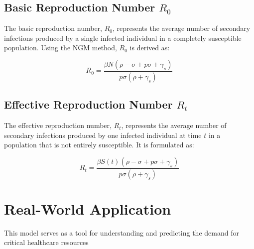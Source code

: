 \documentclass[lettersize, journal]{IEEEtran}
\begin{document}
\subsection{Basic Reproduction Number \( R_0 \)}
The basic reproduction number, \( R_0 \), represents the average number of secondary infections produced by a single infected individual in a completely susceptible population. Using the NGM method, \( R_0 \) is derived as:

\[ R_0 = \frac{\beta N ( \rho - \sigma + p \sigma + \gamma_s )}{p \sigma ( \rho + \gamma_s )} \]

\subsection{Effective Reproduction Number \( R_t \)}
The effective reproduction number, \( R_t \), represents the average number of secondary infections produced by one infected individual at time \( t \) in a population that is not entirely susceptible. It is formulated as:

\[ R_t = \frac{\beta S(t) ( \rho - \sigma + p \sigma + \gamma_s )}{p \sigma ( \rho + \gamma_s )} \]

\section{Real-World Application}
This model serves as a tool for understanding and predicting the demand for critical healthcare resources
\end{document}
